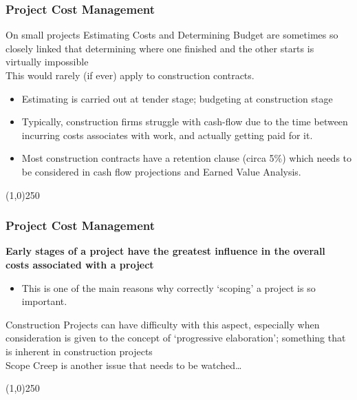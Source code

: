 \begin{frame}
\frametitle{Project Cost Management}
On small projects Estimating Costs and Determining Budget are sometimes so closely linked that determining where one finished and the other starts is virtually impossible\\
This would rarely (if ever) apply to construction contracts.
\begin{itemize}
	\item Estimating is carried out at tender stage; budgeting at construction stage
	\item Typically, construction firms struggle with cash-flow due to the time between incurring costs associates with work, and actually getting paid for it.
	\item Most construction contracts have a retention clause (circa 5\%) which needs to be considered in cash flow projections and Earned Value Analysis. 
\end{itemize}
\end{frame}
\begin{center}\line(1,0){250}\end{center}






\begin{frame}
\frametitle{Project Cost Management}
\textbf{Early stages of a project have the greatest influence in the overall costs associated with a project}
\begin{itemize}
	\item This is one of the main reasons why correctly ‘scoping’ a project is so important.
\end{itemize}
Construction Projects can have difficulty with this aspect, especially when consideration is given to the concept of ‘progressive elaboration’; something that is inherent in construction projects\\
Scope Creep is another issue that needs to be watched\ldots
\end{frame}
\begin{center}\line(1,0){250}\end{center}






